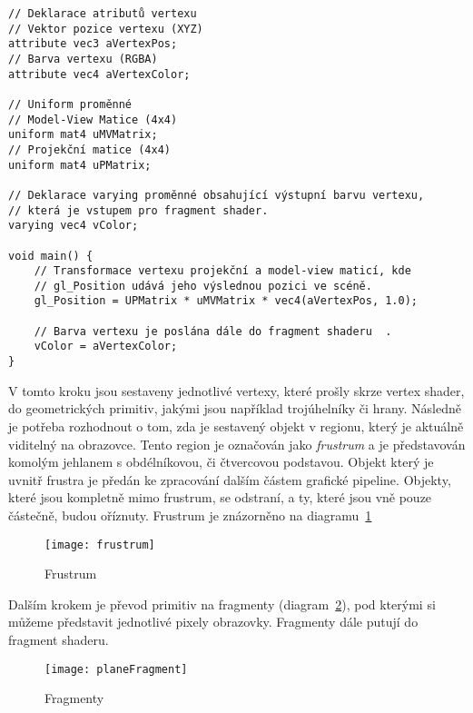 \begin{lstlisting}[caption=Ukázka zdrojového kódu GLSL pro vertex shader,label=code:vertexShader]
// Deklarace atributů vertexu
// Vektor pozice vertexu (XYZ)
attribute vec3 aVertexPos;
// Barva vertexu (RGBA)
attribute vec4 aVertexColor;

// Uniform proměnné
// Model-View Matice (4x4)
uniform mat4 uMVMatrix;
// Projekční matice (4x4)
uniform mat4 uPMatrix;

// Deklarace varying proměnné obsahující výstupní barvu vertexu, 
// která je vstupem pro fragment shader.
varying vec4 vColor;

void main() {
	// Transformace vertexu projekční a model-view maticí, kde
	// gl_Position udává jeho výslednou pozici ve scéně.
	gl_Position = UPMatrix * uMVMatrix * vec4(aVertexPos, 1.0);
	
	// Barva vertexu je poslána dále do fragment shaderu	.
	vColor = aVertexColor;
}
\end{lstlisting}
\pagebreak
{}
V tomto kroku jsou sestaveny jednotlivé vertexy, které prošly skrze vertex shader, do geometrických primitiv, jakými jsou například trojúhelníky či hrany. Následně je potřeba rozhodnout o tom, zda je sestavený objekt v regionu, který je aktuálně viditelný na obrazovce. Tento region je označován jako \textit{frustrum} a je představován komolým jehlanem s obdélníkovou, či čtvercovou podstavou. Objekt který je uvnitř frustra je předán ke zpracování dalším částem grafické pipeline. Objekty, které jsou kompletně mimo frustrum, se odstraní, a ty, které jsou vně pouze částečně, budou oříznuty. Frustrum je znázorněno na diagramu~\ref{fig:frustrum}

\begin{figure}[htb]
\centering
\texttt{[image: frustrum]}
\caption{Frustrum}
\label{fig:frustrum}
\end{figure}

Dalším krokem je převod primitiv na fragmenty (diagram~\ref{fig:planeFragment}), pod kterými si můžeme představit jednotlivé pixely obrazovky. Fragmenty dále putují do fragment shaderu.

\begin{figure}[htb]
\centering
\texttt{[image: planeFragment]}
\caption{Fragmenty}
\label{fig:planeFragment}
\end{figure}


